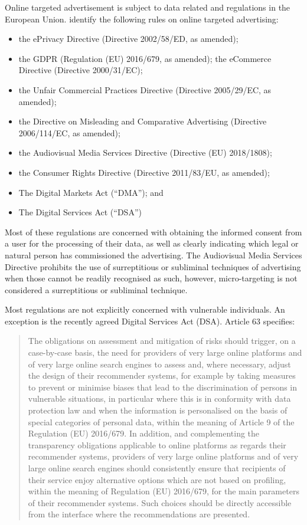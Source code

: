 \documentclass[11pt,theapa]{article}
\theoremstyle{plain}
\begin{document}
Online targeted advertisement is subject to data related and regulations in the European Union. \cite{Covington2022} identify  the following rules on online targeted advertising:
\begin{itemize}
    \item the ePrivacy Directive (Directive 2002/58/ED, as amended);
    \item the GDPR (Regulation (EU) 2016/679, as amended);
    the eCommerce Directive (Directive 2000/31/EC);
    \item the Unfair Commercial Practices Directive (Directive 2005/29/EC, as amended);
    \item the Directive on Misleading and Comparative Advertising (Directive 2006/114/EC, as amended);
    \item the Audiovisual Media Services Directive (Directive (EU) 2018/1808); 
    \item the Consumer Rights Directive (Directive 2011/83/EU, as amended);
    \item The Digital Markets Act (``DMA''); and
    \item The Digital Services Act (``DSA'') 
\end{itemize}

Most of these regulations are concerned with obtaining the informed consent from a user for the processing of their data, as well as clearly indicating which legal or natural person has commissioned the advertising. The Audiovisual Media Services Directive prohibits the use of surreptitious or subliminal techniques of advertising when those cannot be readily recognised as such, however, micro-targeting is not considered a surreptitious or subliminal technique. 

Most regulations are not explicitly concerned with vulnerable individuals. An exception is the recently agreed Digital Services Act (DSA). Article 63 specifies: 
\begin{quote}
The obligations on assessment and mitigation of risks should trigger, on a case-by-case basis, the need for providers of very large online platforms and of very large online search engines to assess and, where necessary, adjust the design of their recommender systems, for example by taking measures to prevent or minimise biases that lead to the discrimination of persons in vulnerable situations, in particular where this is in conformity with data protection law and when the information is personalised on the basis of special categories of personal data, within the meaning of Article 9 of the Regulation (EU) 2016/679. In addition, and complementing the transparency obligations applicable to online platforms as regards their recommender systems, providers of very large online platforms and of very large online search engines should consistently ensure that  recipients of their service enjoy alternative options which are not based on profiling, within the meaning of Regulation (EU) 2016/679, for the main parameters of their recommender systems. Such choices should be directly accessible from the interface where the recommendations are presented.
\end{quote}
\end{document}
